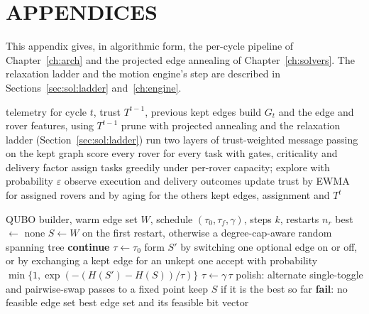 \appendix
\renewcommand{\thechapter}{\arabic{chapter}}
\setcounter{chapter}{0}
\renewcommand{\thetable}{A\arabic{chapter}.\arabic{table}}
\renewcommand{\thefigure}{A\arabic{chapter}.\arabic{figure}}
\chapter*{APPENDICES}

\label{app:pseudo}

This appendix gives, in algorithmic form, the per-cycle pipeline of
Chapter~\ref{ch:arch} and the projected edge annealing of
Chapter~\ref{ch:solvers}. The relaxation ladder and the motion engine's step
are described in Sections~\ref{sec:sol:ladder} and~\ref{ch:engine}.

\begin{algorithm}[H]
\caption{One pipeline cycle}
\label{alg:app:cycle}
\begin{algorithmic}[1]
\Require telemetry for cycle $t$, trust $T^{t-1}$, previous kept edges
\State build $G_t$ and the edge and rover features, using $T^{t-1}$
\State prune with projected annealing and the relaxation ladder (Section~\ref{sec:sol:ladder})
\State run two layers of trust-weighted message passing on the kept graph
\State score every rover for every task with gates, criticality and delivery factor
\State assign tasks greedily under per-rover capacity; explore with probability $\varepsilon$
\State observe execution and delivery outcomes
\State update trust by EWMA for assigned rovers and by aging for the others
\Ensure kept edges, assignment and $T^{t}$
\end{algorithmic}
\end{algorithm}

\begin{algorithm}[H]
\caption{Projected edge annealing}
\label{alg:app:pea}
\begin{algorithmic}[1]
\Require QUBO builder, warm edge set $W$, schedule $(\tau_0,\tau_f,\gamma)$, steps $k$, restarts $n_r$
\State best $\gets$ none
  \State $S\gets W$ on the first restart, otherwise a degree-cap-aware random spanning tree
   \State \textbf{continue} \EndIf
  \State $\tau\gets\tau_0$
      \State form $S'$ by switching one optional edge on or off, or by exchanging a kept edge for an unkept one
        \State accept with probability $\min\{1,\exp(-(H(S')-H(S))/\tau)\}$
      \EndIf
    \EndFor
    \State $\tau\gets\gamma\,\tau$
  \EndWhile
  \State polish: alternate single-toggle and pairwise-swap passes to a fixed point
  \State keep $S$ if it is the best so far
\EndFor
{} \State \textbf{fail}: no feasible edge set \EndIf
\Ensure best edge set and its feasible bit vector
\end{algorithmic}
\end{algorithm}

